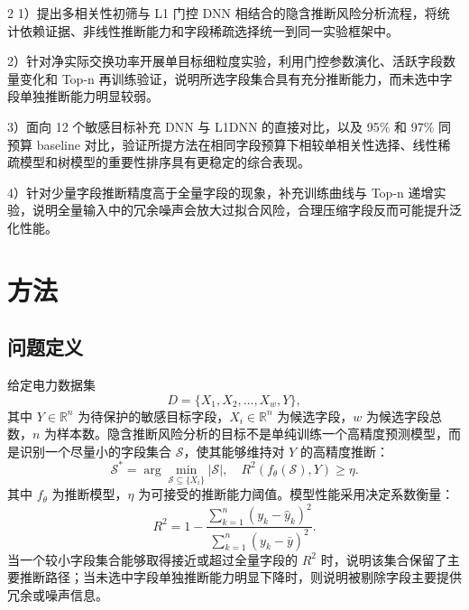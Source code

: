 \documentclass[UTF8,zihao=5,twoside]{ctexart}
\numberwithin{equation}{section}
\begin{document}
\begin{multicols}{2}
1）提出多相关性初筛与 L1 门控 DNN 相结合的隐含推断风险分析流程，将统计依赖证据、非线性推断能力和字段稀疏选择统一到同一实验框架中。

2）针对净实际交换功率开展单目标细粒度实验，利用门控参数演化、活跃字段数量变化和 Top-n 再训练验证，说明所选字段集合具有充分推断能力，而未选中字段单独推断能力明显较弱。

3）面向 12 个敏感目标补充 DNN 与 L1DNN 的直接对比，以及 95\% 和 97\% 同预算 baseline 对比，验证所提方法在相同字段预算下相较单相关性选择、线性稀疏模型和树模型的重要性排序具有更稳定的综合表现。

4）针对少量字段推断精度高于全量字段的现象，补充训练曲线与 Top-n 递增实验，说明全量输入中的冗余噪声会放大过拟合风险，合理压缩字段反而可能提升泛化性能。

\section{方法}
\subsection{问题定义}
给定电力数据集
\begin{equation}
D=\{X_1,X_2,\ldots,X_w,Y\},
\end{equation}
其中 $Y\in\mathbb{R}^{n}$ 为待保护的敏感目标字段，$X_i\in\mathbb{R}^{n}$ 为候选字段，$w$ 为候选字段总数，$n$ 为样本数。隐含推断风险分析的目标不是单纯训练一个高精度预测模型，而是识别一个尽量小的字段集合 $\mathcal{S}$，使其能够维持对 $Y$ 的高精度推断：
\begin{equation}
\mathcal{S}^{*}=\arg\min_{\mathcal{S}\subseteq \{X_i\}}\left|\mathcal{S}\right|,
\quad
R^2(f_{\theta}(\mathcal{S}),Y)\geq \eta .
\end{equation}
其中 $f_{\theta}$ 为推断模型，$\eta$ 为可接受的推断能力阈值。模型性能采用决定系数衡量：
\begin{equation}
R^2=1-\frac{\sum_{k=1}^{n}(y_k-\hat{y}_k)^2}{\sum_{k=1}^{n}(y_k-\bar{y})^2}.
\end{equation}
当一个较小字段集合能够取得接近或超过全量字段的 $R^2$ 时，说明该集合保留了主要推断路径；当未选中字段单独推断能力明显下降时，则说明被剔除字段主要提供冗余或噪声信息。


\end{multicols}
\end{document}
